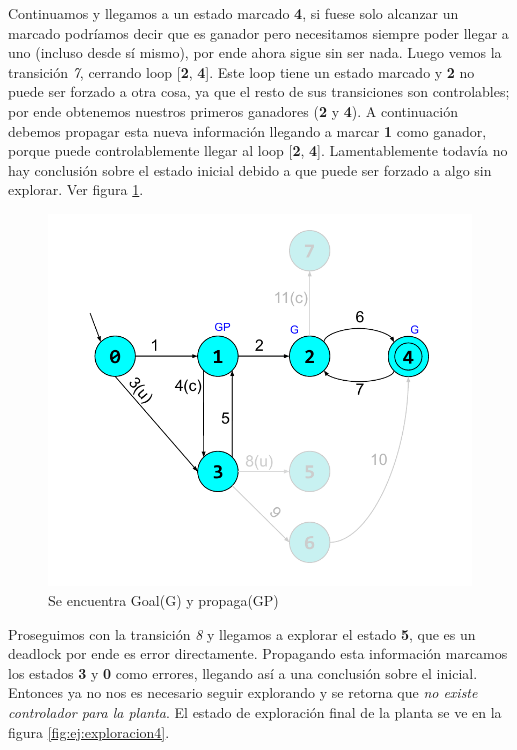 Continuamos y llegamos a un estado marcado \textbf{4}, si fuese solo alcanzar un marcado podríamos decir que es ganador pero necesitamos siempre poder llegar a uno (incluso desde sí mismo), por ende ahora sigue sin ser nada. Luego vemos la transición \textit{7}, cerrando loop [\textbf{2}, \textbf{4}]. Este loop tiene un estado marcado y \textbf{2} no puede ser forzado a otra cosa, ya que el resto de sus transiciones son controlables; por ende obtenemos nuestros primeros ganadores (\textbf{2} y \textbf{4}). A continuación debemos propagar esta nueva información llegando a marcar \textbf{1} como ganador, porque puede controlablemente llegar al loop [\textbf{2}, \textbf{4}]. Lamentablemente todavía no hay conclusión sobre el estado inicial debido a que puede ser forzado a algo sin explorar. Ver figura \ref{fig:ej:exploracion3}.

\begin{figure}[h]
 \centering
 \includegraphics[scale=0.6]{figures/ejemplo_on-the-fly/3.pdf}
 \caption{Se encuentra Goal(G) y propaga(GP)}
 \label{fig:ej:exploracion3}
\end{figure}

Proseguimos con la transición \textit{8} y llegamos a explorar el estado \textbf{5}, que es un deadlock por ende es error directamente. Propagando esta información marcamos los estados \textbf{3} y \textbf{0} como errores, llegando así a una conclusión sobre el inicial. Entonces ya no nos es necesario seguir explorando y se retorna que \textit{no existe controlador para la planta}. El estado de exploración final de la planta se ve en la figura \ref{fig:ej:exploracion4}.

